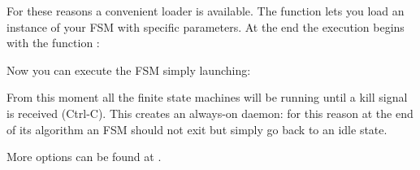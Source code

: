 \documentclass[letterpaper,10pt,english]{sphinxmanual}
\begin{document}
For these reasons a convenient loader is available. The 
function lets you load an instance of your FSM with specific
parameters. At the end the execution begins with the function
:

%
\begin{sphinxVerbatim}[commandchars=\\\{\}]
   

 

\end{sphinxVerbatim}

Now you can execute the FSM simply launching:

%
\begin{sphinxVerbatim}[commandchars=\\\{\}]
 
\end{sphinxVerbatim}

From this moment all the finite state machines will be running until a
kill signal is received (Ctrl-C). This creates an always-on daemon:
for this reason at the end of its algorithm an FSM should not exit
but simply go back to an idle state.

More options can be found at {\hyperref[\detokenize{loader:loader}]{}}.
\end{document}
